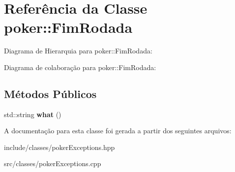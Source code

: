 \hypertarget{classpoker_1_1FimRodada}{}\section{Referência da Classe poker\+:\+:Fim\+Rodada}
\label{classpoker_1_1FimRodada}


Diagrama de Hierarquia para poker\+:\+:Fim\+Rodada\+:


Diagrama de colaboração para poker\+:\+:Fim\+Rodada\+:
\subsection*{Métodos Públicos}
\begin{DoxyCompactItemize}
\item 
\mbox{\label{classpoker_1_1FimRodada_ae254e5a7c9616fa0c1f90f62f545ac59}} 
std\+::string {\bfseries what} ()
\end{DoxyCompactItemize}


A documentação para esta classe foi gerada a partir dos seguintes arquivos\+:\begin{DoxyCompactItemize}
\item 
include/classes/poker\+Exceptions.\+hpp\item 
src/classes/poker\+Exceptions.\+cpp\end{DoxyCompactItemize}
